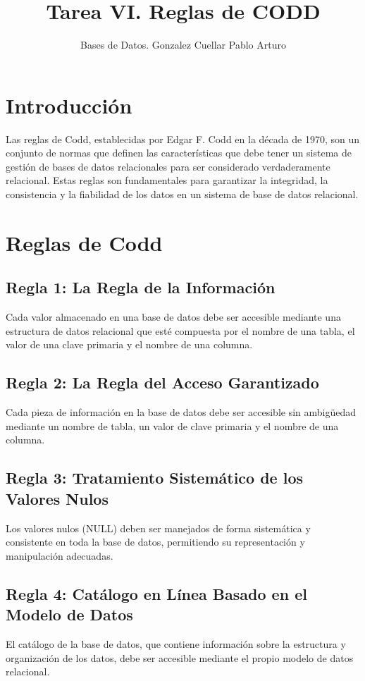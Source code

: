 \documentclass{article}
\title{Tarea VI. Reglas de CODD}
\author{Bases de Datos. Gonzalez Cuellar Pablo Arturo}
\date{}
\begin{document}
	
	\maketitle
	
	\section*{Introducción}
	Las reglas de Codd, establecidas por Edgar F. Codd en la década de 1970, son un conjunto de normas que definen las características que debe tener un sistema de gestión de bases de datos relacionales para ser considerado verdaderamente relacional. Estas reglas son fundamentales para garantizar la integridad, la consistencia y la fiabilidad de los datos en un sistema de base de datos relacional.
	
	\section*{Reglas de Codd}
	
	\subsection*{Regla 1: La Regla de la Información}
	Cada valor almacenado en una base de datos debe ser accesible mediante una estructura de datos relacional que esté compuesta por el nombre de una tabla, el valor de una clave primaria y el nombre de una columna.
	
	\subsection*{Regla 2: La Regla del Acceso Garantizado}
	Cada pieza de información en la base de datos debe ser accesible sin ambigüedad mediante un nombre de tabla, un valor de clave primaria y el nombre de una columna.
	
	\subsection*{Regla 3: Tratamiento Sistemático de los Valores Nulos}
	Los valores nulos (NULL) deben ser manejados de forma sistemática y consistente en toda la base de datos, permitiendo su representación y manipulación adecuadas.
	
	\subsection*{Regla 4: Catálogo en Línea Basado en el Modelo de Datos}
	El catálogo de la base de datos, que contiene información sobre la estructura y organización de los datos, debe ser accesible mediante el propio modelo de datos relacional.
	
\end{document}
